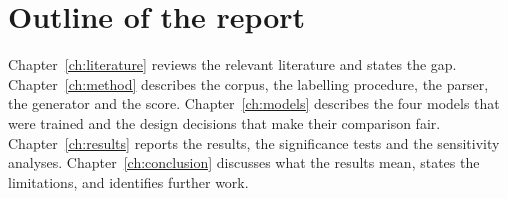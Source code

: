\section{Outline of the report}

Chapter~\ref{ch:literature} reviews the relevant literature and states the
gap. Chapter~\ref{ch:method} describes the corpus, the labelling
procedure, the parser, the generator and the score.
Chapter~\ref{ch:models} describes the four models that were trained and
the design decisions that make their comparison fair.
Chapter~\ref{ch:results} reports the results, the significance tests and
the sensitivity analyses. Chapter~\ref{ch:conclusion} discusses what the
results mean, states the limitations, and identifies further work.
